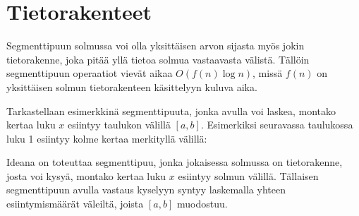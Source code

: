 \section{Tietorakenteet}


Segmenttipuun solmussa voi olla
yksittäisen arvon
sijasta myös jokin tietorakenne,
joka pitää yllä tietoa solmua vastaavasta välistä.
Tällöin segmenttipuun operaatiot vievät aikaa
$O(f(n) \log n)$, missä $f(n)$ on
yksittäisen solmun tietorakenteen
käsittelyyn kuluva aika.

Tarkastellaan esimerkkinä segmenttipuuta,
jonka avulla voi laskea, montako kertaa
luku $x$ esiintyy taulukon välillä $[a,b]$.
Esimerkiksi seuravassa taulukossa
luku 1 esiintyy kolme kertaa
merkityllä välillä:

\begin{center}
\end{center}

Ideana on toteuttaa segmenttipuu, jonka
jokaisessa solmussa on tietorakenne,
josta voi kysyä,
montako kertaa luku $x$ esiintyy solmun välillä.
Tällaisen segmenttipuun avulla
vastaus kyselyyn syntyy laskemalla yhteen
esiintymismäärät väleiltä, joista $[a,b]$ muodostuu.

